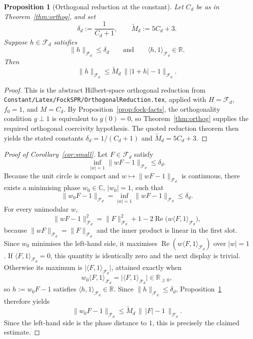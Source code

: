 \documentclass[11pt]{amsart}
\newtheorem{proposition}[theorem]{Proposition}
\theoremstyle{remark}
\newcommand{\C}{\mathbb{C}}
\newcommand{\abs}[1]{\lvert #1 \rvert}
\newcommand{\norm}[1]{\lVert #1 \rVert}
\newcommand{\Fd}{\mathcal{F}_d}
\begin{document}
\begin{proposition}[Orthogonal reduction at the constant]\label{prop:orth-reduction}
Let $C_d$ be as in Theorem~\ref{thm:orthog}, and set
\[
\delta_d := \frac{1}{C_d+1},
\qquad
\widetilde M_d := 5C_d+3.
\]
Suppose $h \in \Fd$ satisfies
\[
\norm{h}_{\Fd} \le \delta_d
\qquad\text{and}\qquad
\langle h,1\rangle_{\Fd} \in \mathbb R.
\]
Then
\[
\norm{h}_{\Fd}
\le
\widetilde M_d\,\norm{\abs{1+h}-1}_{\Fd}.
\]
\end{proposition}

\begin{proof}
This is the abstract Hilbert-space orthogonal reduction from
\texttt{Constant/Latex/FockSPR/OrthogonalReduction.tex}, applied with
$H=\Fd$, $f_0=1$, and $M=C_d$.  By
Proposition~\ref{prop:fock-facts}, the orthogonality condition $g \perp 1$
is equivalent to $g(0)=0$, so Theorem~\ref{thm:orthog} supplies the
required orthogonal coercivity hypothesis.  The quoted reduction theorem
then yields the stated constants $\delta_d = 1/(C_d+1)$ and
$\widetilde M_d = 5C_d+3$.
\end{proof}

\begin{proof}[Proof of Corollary~\ref{cor:small}]
Let $F \in \Fd$ satisfy
\[
\inf_{\abs{w}=1}\norm{wF-1}_{\Fd} \le \delta_d.
\]
Because the unit circle is compact and
$w \mapsto \norm{wF-1}_{\Fd}$ is continuous, there exists a minimising
phase $w_0 \in \C$, $\abs{w_0}=1$, such that
\[
\norm{w_0F-1}_{\Fd}
=
\inf_{\abs{w}=1}\norm{wF-1}_{\Fd}
\le
\delta_d.
\]
For every unimodular $w$,
\[
\norm{wF-1}_{\Fd}^2
=
\norm{F}_{\Fd}^2 + 1 - 2\operatorname{Re}\!\bigl(w\langle F,1\rangle_{\Fd}\bigr),
\]
because $\norm{wF}_{\Fd}=\norm{F}_{\Fd}$ and the inner product is linear in
the first slot.  Since $w_0$ minimises the left-hand side, it maximises
$\operatorname{Re}(w\langle F,1\rangle_{\Fd})$ over $\abs{w}=1$.  If
$\langle F,1\rangle_{\Fd}=0$, this quantity is identically zero and the next
display is trivial.  Otherwise its maximum is
$\abs{\langle F,1\rangle_{\Fd}}$, attained exactly when
\[
w_0 \langle F,1\rangle_{\Fd}
=
\bigl|\langle F,1\rangle_{\Fd}\bigr|
\in
\mathbb R_{\ge 0},
\]
so $h := w_0F-1$ satisfies $\langle h,1\rangle_{\Fd} \in \mathbb R$.
Since $\norm{h}_{\Fd}\le \delta_d$, Proposition~\ref{prop:orth-reduction}
therefore yields
\[
\norm{w_0F-1}_{\Fd}
\le
\widetilde M_d\,\bigl\|\, \abs{F} - 1 \,\bigr\|_{\Fd}.
\]
Since the left-hand side is the phase distance to $1$, this is precisely
the claimed estimate.
\end{proof}
\end{document}
